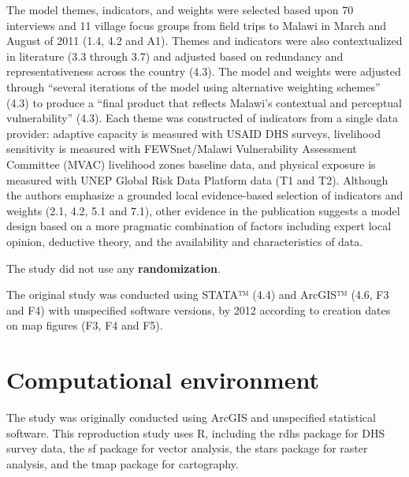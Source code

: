 \documentclass[
]{article}
\begin{document}
The model themes, indicators, and weights were selected based upon 70
interviews and 11 village focus groups from field trips to Malawi in
March and August of 2011 (1.4, 4.2 and A1). Themes and indicators were
also contextualized in literature (3.3 through 3.7) and adjusted based
on redundancy and representativeness across the country (4.3). The model
and weights were adjusted through ``several iterations of the model
using alternative weighting schemes'' (4.3) to produce a ``final product
that reflects Malawi's contextual and perceptual vulnerability'' (4.3).
Each theme was constructed of indicators from a single data provider:
adaptive capacity is measured with USAID DHS surveys, livelihood
sensitivity is measured with FEWSnet/Malawi Vulnerability Assessment
Committee (MVAC) livelihood zones baseline data, and physical exposure
is measured with UNEP Global Risk Data Platform data (T1 and T2).
Although the authors emphasize a grounded local evidence-based selection
of indicators and weights (2.1, 4.2, 5.1 and 7.1), other evidence in the
publication suggests a model design based on a more pragmatic
combination of factors including expert local opinion, deductive theory,
and the availability and characteristics of data.

The study did not use any \textbf{randomization}.

The original study was conducted using STATA™ (4.4) and ArcGIS™ (4.6, F3
and F4) with unspecified software versions, by 2012 according to
creation dates on map figures (F3, F4 and F5).

\hypertarget{computational-environment}{%
\section{Computational environment}\label{computational-environment}}

The study was originally conducted using ArcGIS and unspecified
statistical software. This reproduction study uses R, including the rdhs
package for DHS survey data, the sf package for vector analysis, the
stars package for raster analysis, and the tmap package for cartography.
\end{document}

